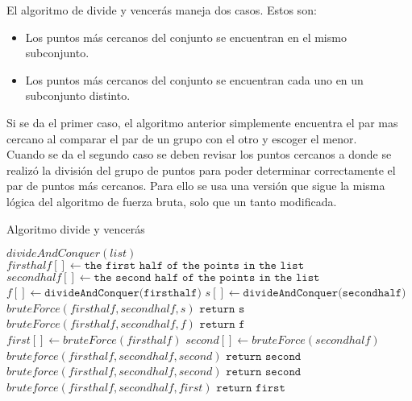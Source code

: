 El algoritmo de divide y vencerás maneja dos casos. Estos son:
\begin{itemize}
    \item 
    Los puntos más cercanos del conjunto se encuentran en el mismo subconjunto.
    \item
    Los puntos más cercanos del conjunto se encuentran cada uno en un subconjunto distinto.
\end{itemize}
Si se da el primer caso, el algoritmo anterior simplemente encuentra el par mas cercano al comparar el par de un grupo con el otro y escoger el menor.\\

Cuando se da el segundo caso se deben revisar los puntos cercanos a donde se realizó la división del grupo de puntos para poder determinar correctamente el par de puntos más cercanos. Para ello se usa una versión que sigue la misma lógica del algoritmo de fuerza bruta, solo que un tanto modificada.\\
\begin{algorithm}[h!]
\caption{Algoritmo divide y vencerás}
\begin{algorithmic}
\State $divideAndConquer(list)$
    \State $ firsthalf[] \gets \texttt{the first half of the points in the list}$
    \State $ secondhalf[] \gets \texttt{the second half of the points in the list}$
    \State $ f[] \gets \texttt{divideAndConquer(firsthalf)}$
    \State $ s[] \gets \texttt{divideAndConquer(secondhalf)}$
    \State $bruteForce(firsthalf, secondhalf, s)$
    \State$\texttt{return s}$
    \Else
    \State $bruteForce(firsthalf, secondhalf, f)$
    \State$\texttt{return f}$
    \EndIf
    \Else
     \State $ first[] \gets bruteForce(firsthalf)$
    \State $ second[] \gets bruteForce(secondhalf)$
        \State $bruteforce(firsthalf, secondhalf,second)$
        \State $\texttt{return second}$
    \Else
            \State $bruteforce(firsthalf, secondhalf,second)$
            \State $\texttt{return second}$
        \Else
            \State $bruteforce(firsthalf, secondhalf,first)$
            \State $\texttt{return first}$
         \EndIf
    \EndIf
\EndIf
\end{algorithmic}    
\end{algorithm}

